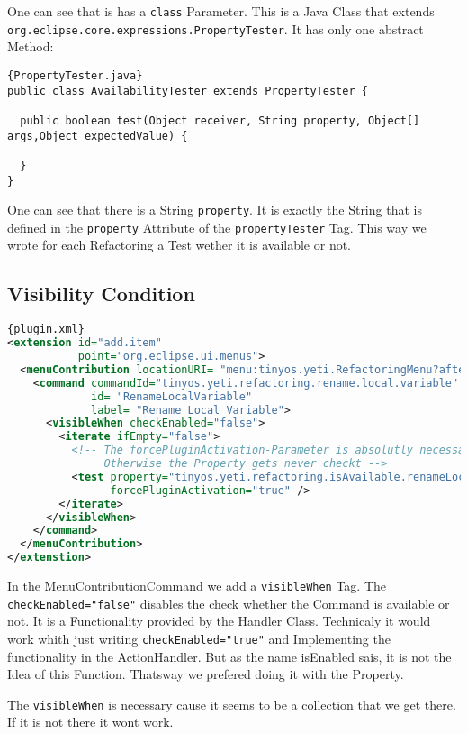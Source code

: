 \documentclass[a4paper,10pt]{report}
\begin{document}
One can see that is has a \verb!class! Parameter. This is a Java Class that extends \verb!org.eclipse.core.expressions.PropertyTester!. It has only one abstract Method:
\begin{lstlisting}[caption=extends PropertyTester]{PropertyTester.java}
public class AvailabilityTester extends PropertyTester {

  public boolean test(Object receiver, String property, Object[] args,Object expectedValue) {
    
  }
}
\end{lstlisting}
One can see that there is a String \verb!property!. It is exactly the String that is defined in the \verb!property! Attribute of the \verb!propertyTester! Tag.
This way we wrote for each Refactoring a Test wether it is available or not.

\subsection{Visibility Condition}


\begin{lstlisting}[language=XML,caption=Visibility Condition ({\it plugin.xml})]{plugin.xml}
<extension id="add.item"
           point="org.eclipse.ui.menus">
  <menuContribution locationURI= "menu:tinyos.yeti.RefactoringMenu?after=additions">
    <command commandId="tinyos.yeti.refactoring.rename.local.variable"
             id= "RenameLocalVariable"
             label= "Rename Local Variable">
      <visibleWhen checkEnabled="false">
        <iterate ifEmpty="false">
          <!-- The forcePluginActivation-Parameter is absolutly necessary. 
               Otherwise the Property gets never checkt -->
          <test property="tinyos.yeti.refactoring.isAvailable.renameLocalVariable"
                forcePluginActivation="true" />
        </iterate>
      </visibleWhen>
    </command>
  </menuContribution>
</extenstion>
\end{lstlisting}
In the MenuContributionCommand we add a \verb!visibleWhen! Tag. The \verb!checkEnabled="false"! disables the check whether the Command is available or not. 
It is a Functionality provided by the Handler Class. Technicaly it would work whith just writing \verb!checkEnabled="true"! and Implementing the functionality in 
the ActionHandler. But as the name isEnabled sais, it is not the Idea of this Function. Thatsway we prefered doing it with the Property.

The \verb!visibleWhen! is necessary cause it seems to be a collection that we get there. If it is not there it wont work.
\end{document}
